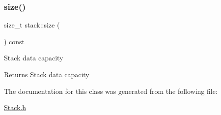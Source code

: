 \subsubsection{\texorpdfstring{size()}{size()}}
{\footnotesize\ttfamily size\+\_\+t stack\+::size (\begin{DoxyParamCaption}{ }\end{DoxyParamCaption}) const}

Stack data capacity

\begin{DoxyReturn}{Returns}
Stack data capacity 
\end{DoxyReturn}


The documentation for this class was generated from the following file\+:\begin{DoxyCompactItemize}
\item 
\hyperlink{_stack_8h}{Stack.\+h}\end{DoxyCompactItemize}
